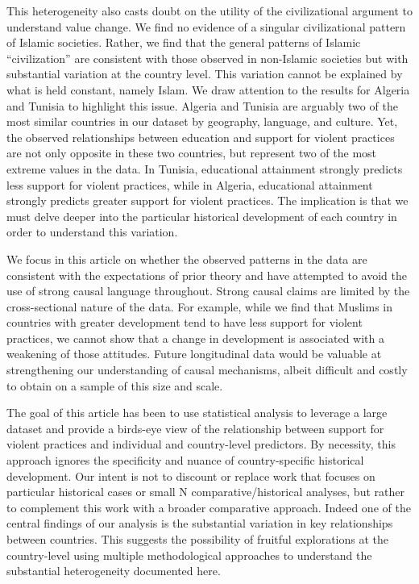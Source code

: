 \documentclass[10pt,letterpaper]{article}
\begin{document}
This heterogeneity also casts doubt on the utility of the civilizational
argument to understand value change. We find no evidence of a singular
civilizational pattern of Islamic societies. Rather, we find that the
general patterns of Islamic ``civilization'' are consistent with those
observed in non-Islamic societies but with substantial variation at the
country level. This variation cannot be explained by what is held
constant, namely Islam. We draw attention to the results for Algeria and
Tunisia to highlight this issue. Algeria and Tunisia are arguably two of
the most similar countries in our dataset by geography, language, and
culture. Yet, the observed relationships between education and support
for violent practices are not only opposite in these two countries, but
represent two of the most extreme values in the data. In Tunisia,
educational attainment strongly predicts less support for violent
practices, while in Algeria, educational attainment strongly predicts
greater support for violent practices. The implication is that we must
delve deeper into the particular historical development of each country
in order to understand this variation.

We focus in this article on whether the observed patterns in the data
are consistent with the expectations of prior theory and have attempted
to avoid the use of strong causal language throughout. Strong causal
claims are limited by the cross-sectional nature of the data. For
example, while we find that Muslims in countries with greater
development tend to have less support for violent practices, we cannot
show that a change in development is associated with a weakening of
those attitudes. Future longitudinal data would be valuable at
strengthening our understanding of causal mechanisms, albeit difficult
and costly to obtain on a sample of this size and scale.

The goal of this article has been to use statistical analysis to
leverage a large dataset and provide a birds-eye view of the
relationship between support for violent practices and individual and
country-level predictors. By necessity, this approach ignores the
specificity and nuance of country-specific historical development. Our
intent is not to discount or replace work that focuses on particular
historical cases or small N comparative/historical analyses, but rather
to complement this work with a broader comparative approach. Indeed one
of the central findings of our analysis is the substantial variation in
key relationships between countries. This suggests the possibility of
fruitful explorations at the country-level using multiple methodological
approaches to understand the substantial heterogeneity documented here.
\end{document}
